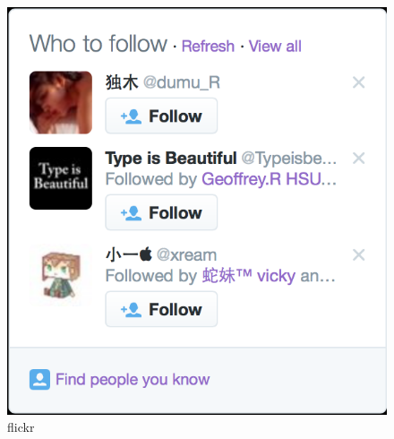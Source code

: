 \begin{figure}[h] 
\begin{minipage}[t]{0.45\linewidth}
\centering
\includegraphics[width=\textwidth]{img/chap1/twitter_recommend.png}
\caption{flickr \label{Twitter推荐}}
\end{minipage}
\hfill
\begin{minipage}[t]{0.45\linewidth}
\centering

\end{minipage}
\end{figure}
